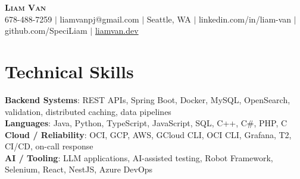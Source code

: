 \documentclass[letterpaper,11pt]{article}
\begin{document}

%
\begin{center}
    \textbf{\Huge \scshape Liam Van} \\ \vspace{1pt}
    \small 678-488-7259 $|$ \small {liamvanpj@gmail.com} $|$ Seattle, WA
 {{$|$ linkedin.com/in/liam-van} {$|$ github.com/SpeciLiam} {$|$ \href{https://liamvan.dev}{liamvan.dev}}}

\end{center}

\section{Technical Skills}
 \begin{itemize}[leftmargin=0.15in, label={}]
    \small{\item{
     \textbf{Backend Systems}{: REST APIs, Spring Boot, Docker, MySQL, OpenSearch, validation, distributed caching, data pipelines} \\
     \textbf{Languages}{: Java, Python, TypeScript, JavaScript, SQL, C++, C\#, PHP, C} \\
     \textbf{Cloud / Reliability}{: OCI, GCP, AWS, GCloud CLI, OCI CLI, Grafana, T2, CI/CD, on-call response} \\
     \textbf{AI / Tooling}{: LLM applications, AI-assisted testing, Robot Framework, Selenium, React, NestJS, Azure DevOps} \\
    }}
 \end{itemize}
%

\end{document}
